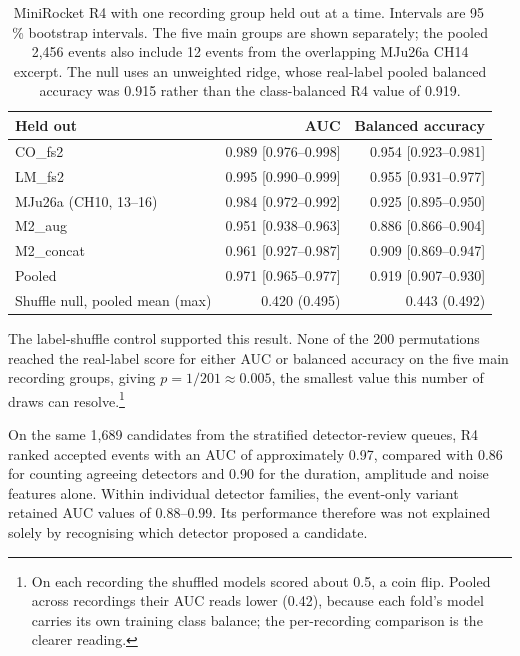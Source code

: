 \begin{table}[htbp]
\centering
\caption[{MiniRocket R4 with one recording group held out at a time.}]{MiniRocket R4 with one recording group held out at a time. Intervals are 95\,\% bootstrap intervals. The five main groups are shown separately; the pooled 2,456 events also include 12 events from the overlapping MJu26a CH14 excerpt. The null uses an unweighted ridge, whose real-label pooled balanced accuracy was 0.915 rather than the class-balanced R4 value of 0.919.}
\label{tab:r4}
\small
\begin{tabular}{lrr}
\toprule
\textbf{Held out} & \textbf{AUC} & \textbf{Balanced accuracy}\\
\midrule
CO\_fs2 & 0.989 [0.976--0.998] & 0.954 [0.923--0.981]\\
LM\_fs2 & 0.995 [0.990--0.999] & 0.955 [0.931--0.977]\\
MJu26a (CH10, 13--16) & 0.984 [0.972--0.992] & 0.925 [0.895--0.950]\\
M2\_aug & 0.951 [0.938--0.963] & 0.886 [0.866--0.904]\\
M2\_concat & 0.961 [0.927--0.987] & 0.909 [0.869--0.947]\\
\midrule
Pooled & 0.971 [0.965--0.977] & 0.919 [0.907--0.930]\\
Shuffle null, pooled mean (max) & 0.420 (0.495) & 0.443 (0.492)\\
\bottomrule
\end{tabular}
\end{table}

The label-shuffle control supported this result. None of the 200 permutations reached the real-label score for either AUC or balanced accuracy on the five main recording groups, giving $p=1/201\approx0.005$, the smallest value this number of draws can resolve.\footnote{On each recording the shuffled models scored about 0.5, a coin flip. Pooled across recordings their AUC reads lower (0.42), because each fold's model carries its own training class balance; the per-recording comparison is the clearer reading.}

On the same 1,689 candidates from the stratified detector-review queues, R4 ranked accepted events with an AUC of approximately 0.97, compared with 0.86 for counting agreeing detectors and 0.90 for the duration, amplitude and noise features alone. Within individual detector families, the event-only variant retained AUC values of 0.88--0.99. Its performance therefore was not explained solely by recognising which detector proposed a candidate.

